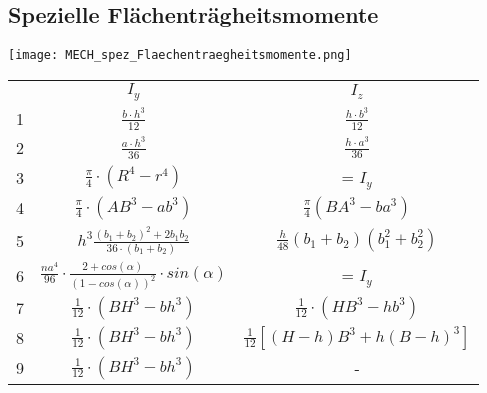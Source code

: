 \documentclass[numerate]{cheatsheet}
\begin{document}
    \subsection{Spezielle Flächenträgheitsmomente}
        \begin{scriptsize}
            \begin{center}
                \texttt{[image: MECH\_spez\_Flaechentraegheitsmomente.png]}
                \begin{tabular}{|c|c|c|}
                    \hline
                    \null & \cellcolor{SkyBlue} $I_y$ & \cellcolor{Tan}$I_z$ \\
                    \hhline{|=|=|=|}
                    \rule[-2.5ex]{0pt}{7ex} 1 & \cellcolor{SkyBlue}$\frac{b\cdot h^3}{12}$ & \cellcolor{Tan}$\frac{h\cdot b^3}{12}$\\
                    \hline
                    \rule[-2.5ex]{0pt}{7ex} 2 & \cellcolor{SkyBlue}$\frac{a\cdot h^3}{36}$ & \cellcolor{Tan}$\frac{h\cdot a^3}{36}$\\
                    \hline
                    \rule[-2.5ex]{0pt}{7ex} 3 & \cellcolor{SkyBlue}$\frac{\pi}{4} \cdot (R^4-r^4)$ & \cellcolor{Tan} = $I_y$ \\
                    \hline
                    \rule[-2.5ex]{0pt}{7ex} 4 & \cellcolor{SkyBlue}$\frac{\pi}{4} \cdot (AB^3-ab^3)$ & \cellcolor{Tan}$\frac{\pi}{4} (BA^3-ba^3)$\\
                    \hline
                    \rule[-2.5ex]{0pt}{7ex} 5 & \cellcolor{SkyBlue}$h^3\frac{(b_1+b_2)^2 + 2b_1b_2}{36\cdot (b_1 + b_2)}$ & \cellcolor{Tan}$\frac{h}{48} (b_1+b_2) (b_1^2 + b_2^2)$\\
                    \hline
                    \rule[-2.5ex]{0pt}{7ex} 6 & \cellcolor{SkyBlue}$\frac{na^4}{96} \cdot \frac{2+ cos(\alpha)}{(1-cos(\alpha))^2} \cdot sin(\alpha)$ & \cellcolor{Tan} = $I_y$ \\
                    \hline
                    \rule[-2.5ex]{0pt}{7ex} 7 & \cellcolor{SkyBlue}$\frac{1}{12} \cdot (BH^3-bh^3)$ & \cellcolor{Tan}$\frac{1}{12} \cdot (HB^3-hb^3)$\\
                    \hline
                    \rule[-2.5ex]{0pt}{7ex} 8 & \cellcolor{SkyBlue}$\frac{1}{12} \cdot (BH^3-bh^3)$ & \cellcolor{Tan}$\frac{1}{12} [(H-h)B^3 + h(B-h)^3]$\\
                    \hline
                    \rule[-2.5ex]{0pt}{7ex} 9 & \cellcolor{SkyBlue}$\frac{1}{12}\cdot (BH^3-bh^3)$ & \cellcolor{Tan}-\\
                    \hline
                \end{tabular}
            \end{center}
        \end{scriptsize}    
\end{document}
